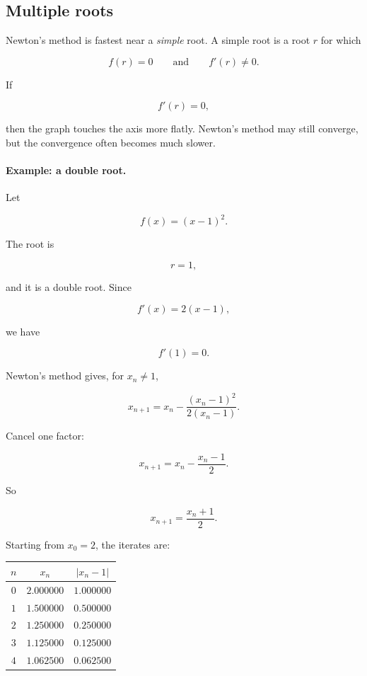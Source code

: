 \subsection{Multiple roots}
\label{subsec:newton-multiple-roots-revisited}

Newton's method is fastest near a \emph{simple} root.  A simple root is a root \(r\) for
which

\[
f(r)=0
\qquad\text{and}\qquad
f'(r)\neq0.
\]

If

\[
f'(r)=0,
\]

then the graph touches the axis more flatly.  Newton's method may still converge, but
the convergence often becomes much slower.

\paragraph{Example: a double root.}
Let

\[
f(x)=(x-1)^2.
\]

The root is

\[
r=1,
\]

and it is a double root.  Since

\[
f'(x)=2(x-1),
\]

we have

\[
f'(1)=0.
\]

Newton's method gives, for \(x_n\neq1\),

\[
x_{n+1}
=
x_n-\frac{(x_n-1)^2}{2(x_n-1)}.
\]

Cancel one factor:

\[
x_{n+1}
=
x_n-\frac{x_n-1}{2}.
\]

So

\[
\boxed{
x_{n+1}=\frac{x_n+1}{2}.
}
\]

Starting from \(x_0=2\), the iterates are:

\begin{center}
\begin{tabular}{c|c|c}
\(n\) & \(x_n\) & \(|x_n-1|\) \\ \hline
\(0\) & \(2.000000\) & \(1.000000\) \\
\(1\) & \(1.500000\) & \(0.500000\) \\
\(2\) & \(1.250000\) & \(0.250000\) \\
\(3\) & \(1.125000\) & \(0.125000\) \\
\(4\) & \(1.062500\) & \(0.062500\)
\end{tabular}
\end{center}

